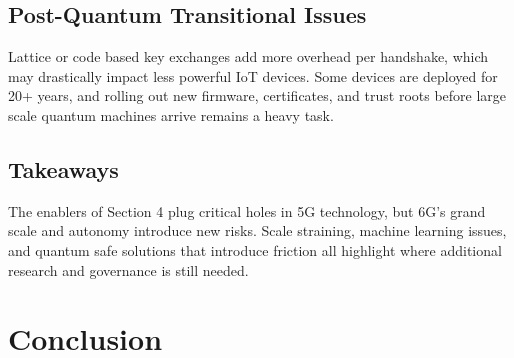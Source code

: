 \documentclass[acmtog]{acmart}
\begin{document}
\subsection{Post-Quantum Transitional Issues}
Lattice or code based key exchanges add more overhead per handshake, which may drastically impact less powerful IoT devices. Some devices are deployed for 20+ years, and rolling out new firmware, certificates, and trust roots before large scale quantum machines arrive remains a heavy task.

\subsection{Takeaways}
The enablers of Section 4 plug critical holes in 5G technology, but 6G's grand scale and autonomy introduce new risks. Scale straining, machine learning issues, and quantum safe solutions that introduce friction all highlight where additional research and governance is still needed.


\section{Conclusion}









\end{document}
